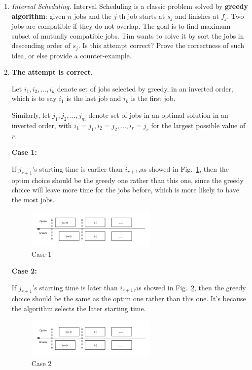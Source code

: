 \documentclass[12pt,a4paper]{article}
\makeatletter
\newtheorem*{solution}{Solution}
\theoremstyle{definition}
\renewenvironment{solution}[1][Solution] {\par\pushQED{\qed}\normalfont\topsep6\p@\@plus6\p@\relax\trivlist\item[\hskip\labelsep\bfseries#1\@addpunct{.}]\ignorespaces}{\popQED\endtrivlist\@endpefalse} \makeatother
\makeatother
\begin{document}
\begin{enumerate}
	\item \textit{Interval Scheduling.} Interval Scheduling is a classic problem solved by \textbf{greedy algorithm}: given $n$ jobs and the $j$-th job starts at $s_j$ and finishes at $f_j$. Two jobs are compatible if they do not overlap. The goal is to find maximum subset of mutually compatible jobs. Tim wants to solve it by sort the jobs in descending order of $s_j$. Is this attempt correct? Prove the correctness of such idea, or else provide a counter-example.

\begin{solution}

\textbf{The attempt is correct}.

Let $i_1,i_2, ...,i_k$ denote set of jobs selected by greedy, in an inverted order, which is to say $i_1$ is the last job and $i_k$ is the first job.

Similarly, let $j_1, j_2,...,j_m$ denote set of jobs in an optimal solution in an inverted order, with $i_1 = j_1, i_2=j_2,...,i_r=j_r$ for the largest possible value of $r$.

\textbf{Case 1:}

If $j_{r+1}$'s starting time is earlier than $i_{r+1}$,as showed in Fig.~\ref{case1}, then the optim  choice should be the greedy one rather than this one, since the greedy choice will leave more time for the jobs before, which is more likely to have the most jobs. 

\begin{figure}[htbp]
    \centering
    \includegraphics[width=0.6\textwidth]{case1.png}
    \caption{Case 1}\label{case1}
\end{figure}

\textbf{Case 2:}

If $j_{r+1}$'s starting time is later than $i_{r+1}$,as showed in Fig.~\ref{case2}, then the greedy choice should be the same as the optim one rather than this one. It's because the algorithm selects the later starting time.

\begin{figure}[htbp]
    \centering
    \includegraphics[width=0.6\textwidth]{case2.png}
    \caption{Case 2}\label{case2}
\end{figure}
\end{solution}


\end{enumerate}
\end{document}
